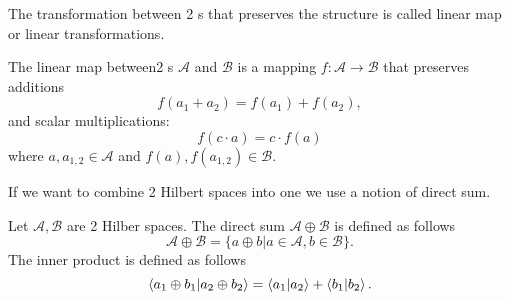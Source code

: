 The
transformation between 2 s that preserves
the structure is called 
linear map or linear transformations.
\begin{definition}
\label{def:linear_map}
The linear map between2 s $\mathcal{A}$
and $\mathcal{B}$ is a mapping $f: \mathcal{A} \to \mathcal{B}$ that
preserves additions  
\[
f(a_1 + a_2) = f(a_1) + f(a_2),
\]
and scalar multiplications:
\[
f(c \cdot a) = c \cdot f(a)
\]
where $a,a_{1,2} \in \mathcal{A}$ and $f(a), f(a_{1,2}) \in \mathcal{B}$.
\end{definition}

If we want to combine 2 Hilbert spaces into one we use a notion of
direct sum.
\begin{definition}
  \label{def:fdhilb_direct_sum}
  Let $\mathcal{A}, \mathcal{B}$ are 2 Hilber spaces. The
  direct sum $\mathcal{A} \oplus \mathcal{B}$ is defined as follows
  \[
  \mathcal{A} \oplus \mathcal{B} = \{a \oplus b | a \in \mathcal{A}, b
  \in \mathcal{B}\}.
  \]
  The inner product is defined as follows
  \[
  \bra{a_1 \oplus b_1}\ket{a_2 \oplus b_2} =
  \bra{a_1}\ket{a_2} + \bra{b_1}\ket{b_2}.
  \]
\end{definition}

